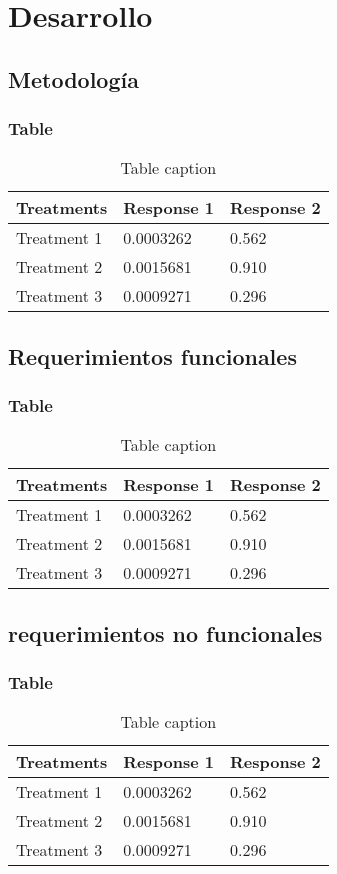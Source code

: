\documentclass{beamer}
\begin{document}
\section{Desarrollo}
\subsection{Metodología} 
\begin{frame}
\frametitle{Table}
\begin{table}
\begin{tabular}{l l l}
\toprule
\textbf{Treatments} & \textbf{Response 1} & \textbf{Response 2}\\
\midrule
Treatment 1 & 0.0003262 & 0.562 \\
Treatment 2 & 0.0015681 & 0.910 \\
Treatment 3 & 0.0009271 & 0.296 \\
\bottomrule
\end{tabular}
\caption{Table caption}
\end{table}
\end{frame}
\subsection{Requerimientos funcionales} 
\begin{frame}
\frametitle{Table}
\begin{table}
\begin{tabular}{l l l}
\toprule
\textbf{Treatments} & \textbf{Response 1} & \textbf{Response 2}\\
\midrule
Treatment 1 & 0.0003262 & 0.562 \\
Treatment 2 & 0.0015681 & 0.910 \\
Treatment 3 & 0.0009271 & 0.296 \\
\bottomrule
\end{tabular}
\caption{Table caption}
\end{table}
\end{frame}

\subsection{requerimientos no funcionales} 
\begin{frame}
\frametitle{Table}
\begin{table}
\begin{tabular}{l l l}
\toprule
\textbf{Treatments} & \textbf{Response 1} & \textbf{Response 2}\\
\midrule
Treatment 1 & 0.0003262 & 0.562 \\
Treatment 2 & 0.0015681 & 0.910 \\
Treatment 3 & 0.0009271 & 0.296 \\
\bottomrule
\end{tabular}
\caption{Table caption}
\end{table}
\end{frame}
\end{document}
